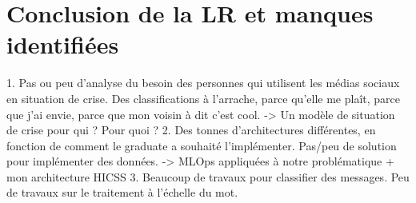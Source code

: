 \section{Conclusion de la LR et manques identifiées}
1. Pas ou peu d'analyse du besoin des personnes qui utilisent les médias sociaux en situation de crise. Des classifications à l'arrache, parce qu'elle me plaît, parce que j'ai envie, parce que mon voisin à dit c'est cool.
-> Un modèle de situation de crise pour qui ? Pour quoi ?
2. Des tonnes d'architectures différentes, en fonction de comment le graduate a souhaité l'implémenter. Pas/peu de solution pour implémenter des données.
-> MLOps appliquées à notre problématique + mon architecture HICSS
3. Beaucoup de travaux pour classifier des messages. Peu de travaux sur le traitement à l'échelle du mot.%



